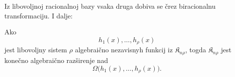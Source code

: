 \documentclass[11pt]{article}
\providecommand{\Kfield}{\mathfrak{K}}
\begin{document}
Iz libovoljnoj racionalnoj bazy vsaka druga dobiva se črez biracionalnu transformaciju. I dalje:

Ako
\[
  h_1(x),\ldots,h_\rho(x)
\]
jest libovoljny sistem $\rho$ algebraično nezavisnyh funkcij iz $\Kfield_{n\rho}$, togda $\Kfield_{n\rho}$ jest konečno algebraično razširenje nad
\[
  \Omega\bigl(h_1(x),\ldots,h_\rho(x)\bigr).
\]
\end{document}
